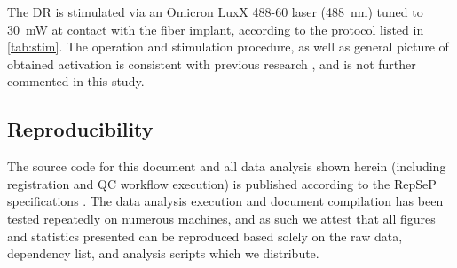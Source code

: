 The DR is stimulated via an Omicron LuxX 488-60 laser (\SI{488}{\nano\meter}) tuned to \SI{30}{\milli\watt} at contact with the fiber implant, according to the protocol listed in \cref{tab:stim}.
The operation and stimulation procedure, as well as general picture of obtained activation is consistent with previous research \cite{Grandjean2019}, and is not further commented in this study.

\subsection{Reproducibility}

The source code for this document and all data analysis shown herein (including registration and QC workflow execution) is published according to the RepSeP specifications \cite{repsep}.
The data analysis execution and document compilation has been tested repeatedly on numerous machines, and as such we attest that all figures and statistics presented can be reproduced based solely on the raw data, dependency list, and analysis scripts which we distribute.
